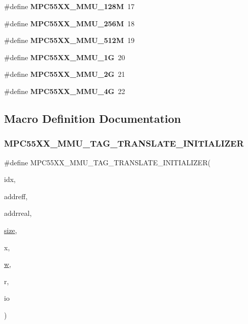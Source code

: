 \begin{DoxyCompactItemize}
\item 
\mbox{\label{regs-mmu_8h_a5d535371a3bc8d671d593ed3d2fd8a7d}} 
\#define {\bfseries M\+P\+C55\+X\+X\+\_\+\+M\+M\+U\+\_\+128M}~17
\item 
\mbox{\label{regs-mmu_8h_a2862fd3071a44bf5bdc35c0924fd83a7}} 
\#define {\bfseries M\+P\+C55\+X\+X\+\_\+\+M\+M\+U\+\_\+256M}~18
\item 
\mbox{\label{regs-mmu_8h_aee2e00d6989d3b6dec1a7161bdf26c51}} 
\#define {\bfseries M\+P\+C55\+X\+X\+\_\+\+M\+M\+U\+\_\+512M}~19
\item 
\mbox{\label{regs-mmu_8h_af35728ca4fd65aa371ea675f96b425bf}} 
\#define {\bfseries M\+P\+C55\+X\+X\+\_\+\+M\+M\+U\+\_\+1G}~20
\item 
\mbox{\label{regs-mmu_8h_aee067eac488daf6fef64164fff70f044}} 
\#define {\bfseries M\+P\+C55\+X\+X\+\_\+\+M\+M\+U\+\_\+2G}~21
\item 
\mbox{\label{regs-mmu_8h_aa81e414dcea7ba52044720d93c1d7bb7}} 
\#define {\bfseries M\+P\+C55\+X\+X\+\_\+\+M\+M\+U\+\_\+4G}~22
\end{DoxyCompactItemize}


\subsection{Macro Definition Documentation}
\mbox{\label{regs-mmu_8h_a9f2bc6a16a65403663fb7071a826719c}} 
\subsubsection{\texorpdfstring{MPC55XX\_MMU\_TAG\_TRANSLATE\_INITIALIZER}{MPC55XX\_MMU\_TAG\_TRANSLATE\_INITIALIZER}}
{\footnotesize\ttfamily \#define M\+P\+C55\+X\+X\+\_\+\+M\+M\+U\+\_\+\+T\+A\+G\+\_\+\+T\+R\+A\+N\+S\+L\+A\+T\+E\+\_\+\+I\+N\+I\+T\+I\+A\+L\+I\+Z\+ER(\begin{DoxyParamCaption}\item[{}]{idx,  }\item[{}]{addreff,  }\item[{}]{addrreal,  }\item[{}]{\mbox{\hyperlink{sun4u_2tte_8h_a245260f6f74972558f61b85227df5aae}{size}},  }\item[{}]{x,  }\item[{}]{\mbox{\hyperlink{sun4u_2tte_8h_aab2ee9ec393223c855b9595e52382ac0}{w}},  }\item[{}]{r,  }\item[{}]{io }\end{DoxyParamCaption})}

